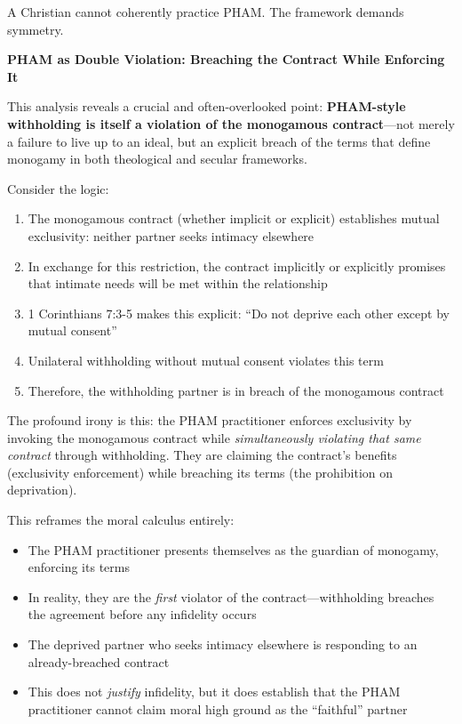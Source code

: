 \documentclass[12pt, letterpaper]{article}
\begin{document}
A Christian cannot coherently practice PHAM. The framework demands symmetry.

\textbf{PHAM as Double Violation: Breaching the Contract While Enforcing It}

This analysis reveals a crucial and often-overlooked point: \textbf{PHAM-style withholding is itself a violation of the monogamous contract}---not merely a failure to live up to an ideal, but an explicit breach of the terms that define monogamy in both theological and secular frameworks.

Consider the logic:
\begin{enumerate}
    \item The monogamous contract (whether implicit or explicit) establishes mutual exclusivity: neither partner seeks intimacy elsewhere
    \item In exchange for this restriction, the contract implicitly or explicitly promises that intimate needs will be met within the relationship
    \item 1 Corinthians 7:3-5 makes this explicit: ``Do not deprive each other except by mutual consent''
    \item Unilateral withholding without mutual consent violates this term
    \item Therefore, the withholding partner is in breach of the monogamous contract
\end{enumerate}

The profound irony is this: the PHAM practitioner enforces exclusivity by invoking the monogamous contract while \textit{simultaneously violating that same contract} through withholding. They are claiming the contract's benefits (exclusivity enforcement) while breaching its terms (the prohibition on deprivation).

This reframes the moral calculus entirely:
\begin{itemize}
    \item The PHAM practitioner presents themselves as the guardian of monogamy, enforcing its terms
    \item In reality, they are the \textit{first} violator of the contract---withholding breaches the agreement before any infidelity occurs
    \item The deprived partner who seeks intimacy elsewhere is responding to an already-breached contract
    \item This does not \textit{justify} infidelity, but it does establish that the PHAM practitioner cannot claim moral high ground as the ``faithful'' partner
\end{itemize}
\end{document}
